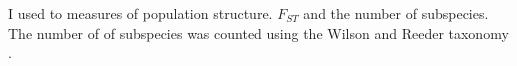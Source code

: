 \begin{knitrout}\footnotesize
{}\color{fgcolor}\begin{kframe}
\begin{alltt}
 \hlkwb{<-} \hlstd{(}\hlstd{,}  \hlstd{=} \hlstd{)}


\hlopt{$} \hlkwb{<-} \hlopt{$}\hlopt{$}
\end{alltt}
\end{kframe}
\end{knitrout}


I used to measures of population structure. 
$F_{ST}$ and the number of subspecies.
The number of of subspecies was counted using the Wilson and Reeder taxonomy \cite{wilson2005mammal}.

